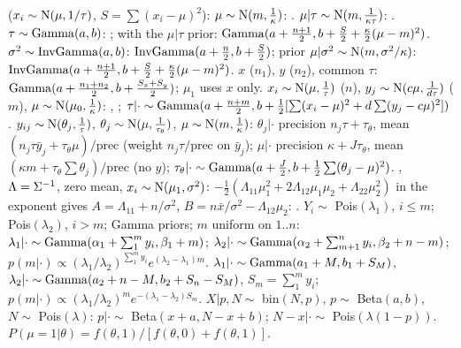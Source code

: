 \sk{} ($x_i\sim\mathrm{N}(\mu,1/\tau)$, $S=\sum(x_i-\mu)^2$):
\li$\mu\sim\mathrm{N}(m,\frac1\kappa)$: .
\li$\mu|\tau\sim\mathrm{N}(m,\frac1{\kappa\tau})$: .
\li$\tau\sim\mathrm{Gamma}(a,b)$: ; with the $\mu|\tau$ prior: $\mathrm{Gamma}(a+\frac{n+1}2,b+\frac S2+\frac\kappa2(\mu-m)^2)$.
\li$\sigma^2\sim\mathrm{InvGamma}(a,b)$: $\mathrm{InvGamma}(a+\frac n2,b+\frac S2)$; prior $\mu|\sigma^2\sim\mathrm{N}(m,\sigma^2/\kappa)$: $\mathrm{InvGamma}(a+\frac{n+1}2,b+\frac S2+\frac\kappa2(\mu-m)^2)$.
\li{} $x$ ($n_1$), $y$ ($n_2$), common $\tau$: $\mathrm{Gamma}(a+\frac{n_1+n_2}2,b+\frac{S_x+S_y}2)$; $\mu_1$ uses $x$ only.
\li{} $x_i\sim\mathrm{N}(\mu,\frac1\tau)$ ($n$), $y_j\sim\mathrm{N}(c\mu,\frac1{d\tau})$ ($m$), $\mu\sim\mathrm{N}(\mu_0,\frac1\kappa)$: , ; $\tau|\cdot\sim\mathrm{Gamma}(a+\frac{n+m}2,b+\frac12[\sum(x_i-\mu)^2+d\sum(y_j-c\mu)^2])$.
\li{} $y_{ij}\sim\mathrm{N}(\theta_j,\frac1\tau)$, $\theta_j\sim\mathrm{N}(\mu,\frac1{\tau_\theta})$, $\mu\sim\mathrm{N}(m,\frac1\kappa)$: $\theta_j|\cdot$ precision $n_j\tau+\tau_\theta$, mean $(n_j\tau\bar y_j+\tau_\theta\mu)/$prec (weight $n_j\tau/$prec on $\bar y_j$); $\mu|\cdot$ precision $\kappa+J\tau_\theta$, mean $(\kappa m+\tau_\theta\sum\theta_j)/$prec (no $y$); $\tau_\theta|\cdot\sim\mathrm{Gamma}(a+\frac J2,b+\frac12\sum(\theta_j-\mu)^2)$.
\li{}, $\Lambda=\Sigma^{-1}$, zero mean, $x_i\sim\mathrm{N}(\mu_1,\sigma^2)$: $-\frac12(\Lambda_{11}\mu_1^2+2\Lambda_{12}\mu_1\mu_2+\Lambda_{22}\mu_2^2)$ in the exponent gives $A=\Lambda_{11}+n/\sigma^2$, $B=n\bar x/\sigma^2-\Lambda_{12}\mu_2$: .
\li{} $Y_i\sim$ Pois$(\lambda_1)$, $i\le m$; Pois$(\lambda_2)$, $i>m$; Gamma priors; $m$ uniform on $1..n$: $\lambda_1|\cdot\sim\mathrm{Gamma}(\alpha_1+\sum_1^my_i,\beta_1+m)$; $\lambda_2|\cdot\sim\mathrm{Gamma}(\alpha_2+\sum_{m+1}^ny_i,\beta_2+n-m)$; $p(m|\cdot)\propto(\lambda_1/\lambda_2)^{\sum_1^my_i}e^{(\lambda_2-\lambda_1)m}$.
\li{} $\lambda_1|\cdot\sim\mathrm{Gamma}(a_1+M,b_1+S_M)$, $\lambda_2|\cdot\sim\mathrm{Gamma}(a_2+n-M,b_2+S_n-S_M)$, $S_m=\sum_1^my_i$; $p(m|\cdot)\propto(\lambda_1/\lambda_2)^me^{-(\lambda_1-\lambda_2)S_m}$.
\li{} $X|p,N\sim$ bin$(N,p)$, $p\sim$ Beta$(a,b)$, $N\sim$ Pois$(\lambda)$: $p|\cdot\sim$ Beta$(x+a,N-x+b)$; $N-x|\cdot\sim$ Pois$(\lambda(1-p))$.
\li{} $P(\mu=1|\theta)=f(\theta,1)/[f(\theta,0)+f(\theta,1)]$.
